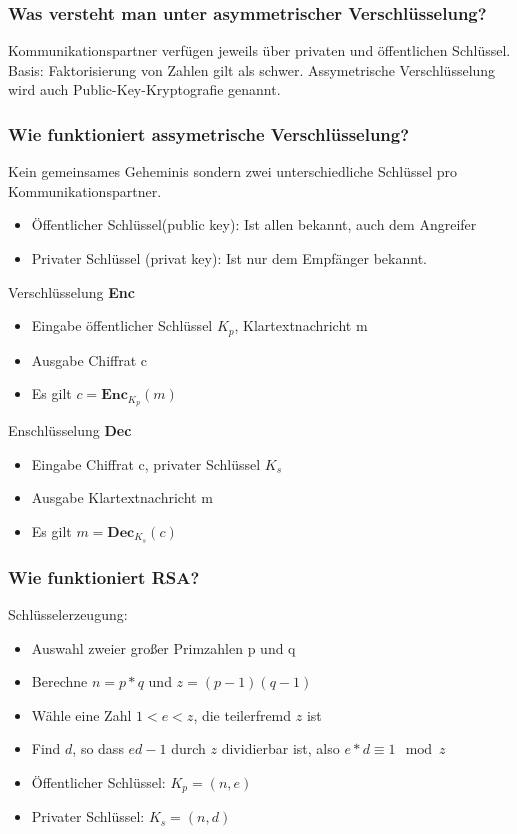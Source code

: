 	\subsubsection{Was versteht man unter asymmetrischer Verschlüsselung?}
	Kommunikationspartner verfügen jeweils über privaten und öffentlichen Schlüssel. Basis: Faktorisierung von Zahlen gilt als schwer. Assymetrische Verschlüsselung wird auch Public-Key-Kryptografie genannt.
	
	\subsubsection{Wie funktioniert assymetrische Verschlüsselung?}
	Kein gemeinsames Geheminis sondern zwei unterschiedliche Schlüssel pro Kommunikationspartner. 
	\begin{itemize}
		\item Öffentlicher Schlüssel(public key): Ist allen bekannt, auch dem Angreifer
		\item Privater Schlüssel (privat key): Ist nur dem Empfänger bekannt. 
	\end{itemize}
	
	Verschlüsselung \textbf{Enc}
		\begin{itemize}
			\item Eingabe öffentlicher Schlüssel $K_p$, Klartextnachricht m
			\item Ausgabe Chiffrat c
			\item Es gilt $c=\textbf{Enc}_{K_p}(m)$
		\end{itemize}
		
	Enschlüsselung \textbf{Dec}
		\begin{itemize}
			\item Eingabe Chiffrat c, privater Schlüssel $K_s$
			\item Ausgabe Klartextnachricht m
			\item Es gilt $m=\textbf{Dec}_{K_s}(c)$
		\end{itemize}
		
	\subsubsection{Wie funktioniert RSA?}
	Schlüsselerzeugung:	
	\begin{itemize}
		\item Auswahl zweier großer Primzahlen p und q
		\item Berechne $n = p*q$ und $z=(p-1)(q-1)$
		\item Wähle eine Zahl $1<e<z$, die teilerfremd $z$ ist
		\item Find $d$, so dass $ed -1$ durch $z$ dividierbar ist, also $e*d \equiv 1 \mod z$
		\item Öffentlicher Schlüssel: $K_p = (n,e)$
		\item Privater Schlüssel: $K_s = (n,d)$
	\end{itemize}
	
